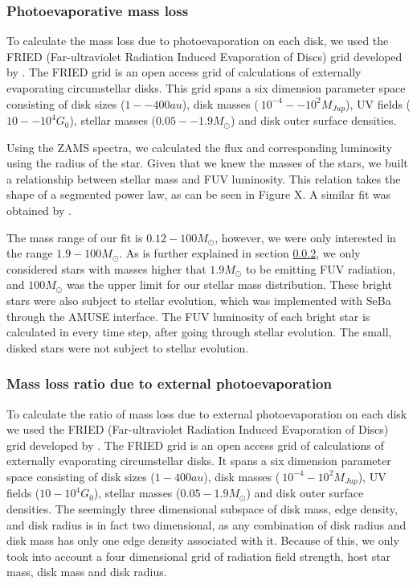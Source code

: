 \documentclass[fleqn,usenatbib]{mnras}
\begin{document}
\subsubsection{Photoevaporative mass loss}
To calculate the mass loss due to photoevaporation on each disk, we used the FRIED (Far-ultraviolet Radiation Induced Evaporation of Discs) grid developed by \citet{haworth2018}. The FRIED grid is an open access grid of calculations of externally evaporating circumstellar disks. This grid spans a six dimension parameter space consisting of disk sizes ($1 -- 400 au$), disk masses ($~10^{-4} -- 10^{2} M_{Jup}$), UV fields ($10 -- 10^{4} G_0$), stellar masses ($0.05 -- 1.9 M_{\odot}$) and disk outer surface densities. 

Using the ZAMS spectra, we calculated the flux and corresponding luminosity using the radius of the star. Given that we knew the masses of the stars, we built a relationship between stellar mass and FUV luminosity. This relation takes the shape of a segmented power law, as can be seen in Figure X. A similar fit was obtained by \citet{parravano2003}.


The mass range of our fit is $0.12 - 100 M_{\odot}$, however, we were only interested in the range $1.9 - 100 M_{\odot}$. As is further explained in section \ref{grid}, we only considered stars with masses higher that $1.9 M_{\odot}$ to be emitting FUV radiation, and $100 M_{\odot}$ was the upper limit for our stellar mass distribution. These bright stars were also subject to stellar evolution, which was implemented with SeBa through the AMUSE interface. The FUV luminosity of each bright star is calculated in every time step, after going through stellar evolution. The small, disked stars were not subject to stellar evolution.

\subsubsection{Mass loss ratio due to external photoevaporation}\label{grid}
To calculate the ratio of mass loss due to external photoevaporation on each disk we used the FRIED (Far-ultraviolet Radiation Induced Evaporation of Discs) grid developed by \citet{haworth2018}. The FRIED grid is an open access grid of calculations of externally evaporating circumstellar disks. It spans a six dimension parameter space consisting of disk sizes ($1 - 400 au$), disk masses ($~10^{-4} - 10^{2} M_{Jup}$), UV fields ($10 - 10^{4} G_0$), stellar masses ($0.05 - 1.9 M_{\odot}$) and disk outer surface densities. The seemingly three dimensional subspace of disk mass, edge density, and disk radius is in fact two dimensional, as any combination of disk radius and disk mass has only one edge density associated with it. Because of this, we only took into account a four dimensional grid of radiation field strength, host star mass, disk mass and disk radius.
\end{document}
